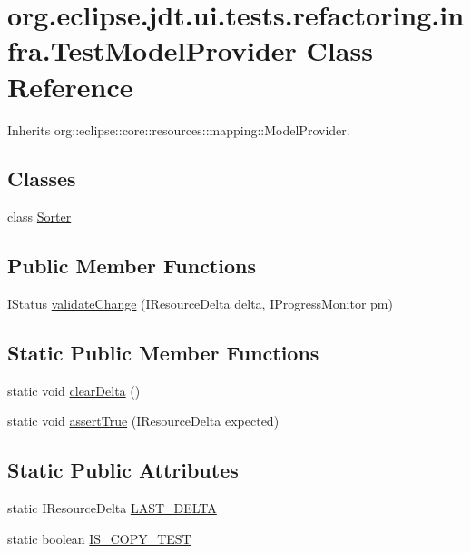 \hypertarget{classorg_1_1eclipse_1_1jdt_1_1ui_1_1tests_1_1refactoring_1_1infra_1_1TestModelProvider}{
\section{org.eclipse.jdt.ui.tests.refactoring.infra.TestModelProvider Class Reference}
\label{classorg_1_1eclipse_1_1jdt_1_1ui_1_1tests_1_1refactoring_1_1infra_1_1TestModelProvider}
}


Inherits org::eclipse::core::resources::mapping::ModelProvider.

\subsection*{Classes}
\begin{DoxyCompactItemize}
\item 
class \hyperlink{classorg_1_1eclipse_1_1jdt_1_1ui_1_1tests_1_1refactoring_1_1infra_1_1TestModelProvider_1_1Sorter}{Sorter}
\end{DoxyCompactItemize}
\subsection*{Public Member Functions}
\begin{DoxyCompactItemize}
\item 
IStatus \hyperlink{classorg_1_1eclipse_1_1jdt_1_1ui_1_1tests_1_1refactoring_1_1infra_1_1TestModelProvider_ad4565e82ca60b09a0b8c1161009e4dba}{validateChange} (IResourceDelta delta, IProgressMonitor pm)
\end{DoxyCompactItemize}
\subsection*{Static Public Member Functions}
\begin{DoxyCompactItemize}
\item 
static void \hyperlink{classorg_1_1eclipse_1_1jdt_1_1ui_1_1tests_1_1refactoring_1_1infra_1_1TestModelProvider_a39a0f6b04970d743d014774dbc9f9a33}{clearDelta} ()
\item 
static void \hyperlink{classorg_1_1eclipse_1_1jdt_1_1ui_1_1tests_1_1refactoring_1_1infra_1_1TestModelProvider_af86bdd78ff0d38e681f50a2649e79f69}{assertTrue} (IResourceDelta expected)
\end{DoxyCompactItemize}
\subsection*{Static Public Attributes}
\begin{DoxyCompactItemize}
\item 
static IResourceDelta \hyperlink{classorg_1_1eclipse_1_1jdt_1_1ui_1_1tests_1_1refactoring_1_1infra_1_1TestModelProvider_a34af87493dbe2276d2bf42a910f5111d}{LAST\_\-DELTA}
\item 
static boolean \hyperlink{classorg_1_1eclipse_1_1jdt_1_1ui_1_1tests_1_1refactoring_1_1infra_1_1TestModelProvider_afeec450fba96b7a08c116bdb00def0f2}{IS\_\-COPY\_\-TEST}
\end{DoxyCompactItemize}
